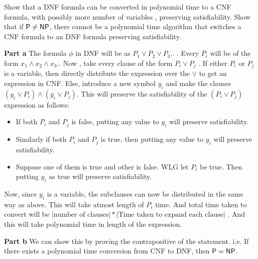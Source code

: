 \documentclass[12pt]{exam}
\begin{document}
\begin{questions}
\begin{solution}
 
\end{solution}


\question
Show that a {\sc DNF} formula can be converted in polynomial time to a {\sc CNF} formula, with possibly more number of variables , preserving satisfiability. Show that if ${\mathsf{P}} \ne {\ensuremath{\mathsf{NP}}}$, there cannot be a polynomial time algorithm that switches a {\sc CNF} formula to an {\sc DNF} formula preserving satisfiability.
\begin{solution}
\newline
\textbf{Part a} \newline
The formula $\phi$ in {\sc DNF} will be as $P_{1} \vee P_{2} \vee P_{3} .. $ . Every $P_{i}$ will be of the form $x_{1} \wedge x_{2} \wedge x_{3} ..$
Now , take every clause of the form $P_{i} \vee P_{j}$ . \newline
If either $P_{i}$ or $P_{j}$ is a variable, then directly distribute the expression over the $\vee$ to get an expression in {\sc CNF}. \newline
Else, introduce a new symbol $y_{i}$ and make the clauses $(y_{i} \vee P_{i}) \wedge (\overline{y_{i}} \vee P_{j})$. \newline
This will preserve the satisfiability of the $(P_{i} \vee P_{j})$ expression as follows:
\begin{itemize}
 \item If both $P_{i}$ and $P_{j}$ is false, putting any value to $y_{i}$ will preserve satisfiability.
 \item Similarly if both $P_{i}$ and $P_{j}$ is true, then putting any value to $y_{i}$ will preserve satisfiability.
 \item Suppose one of them is true and other is false. WLG let $P_{i}$ be true. Then putting $y_{i}$ as true will preserve satisfiability.
\end{itemize}

Now, since $y_{i}$ is a variable, the subclauses can now be distributed in the same way as above. This will take atmost length of $P_{i}$ time.
And total time taken to convert will be $|\text{number of clauses}| \ast |\text{Time taken to expand each clause}|$ . And this will 
take polynomial time in length of the expression.

\textbf{Part b} \newline
We can show this by proving the contrapositive of the statement. i.e. If there exists a polynomial time conversion from {\sc CNF} to {\sc DNF}, then ${\mathsf{P}} = {\mathsf{NP}}$.
\newline


\end{solution}
\end{questions}
\end{document}
